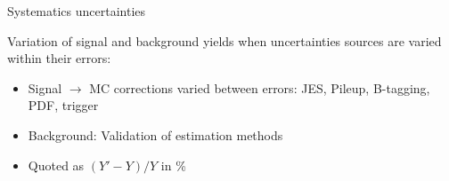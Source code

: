 \begin{frame}{Systematics uncertainties}
\vspace{-.2cm}

\begin{block}{}\scriptsize
Variation of signal and background yields when uncertainties sources are varied within their errors:
  \begin{itemize}
  \item Signal $\to$ MC corrections varied between errors: JES, Pileup, B-tagging, PDF, trigger
  \item Background: Validation of estimation methods
  \item Quoted as $(Y'-Y)/Y$ in \%
  \end{itemize}
\end{block}

\begin{center}
\end{center}

\end{frame}

